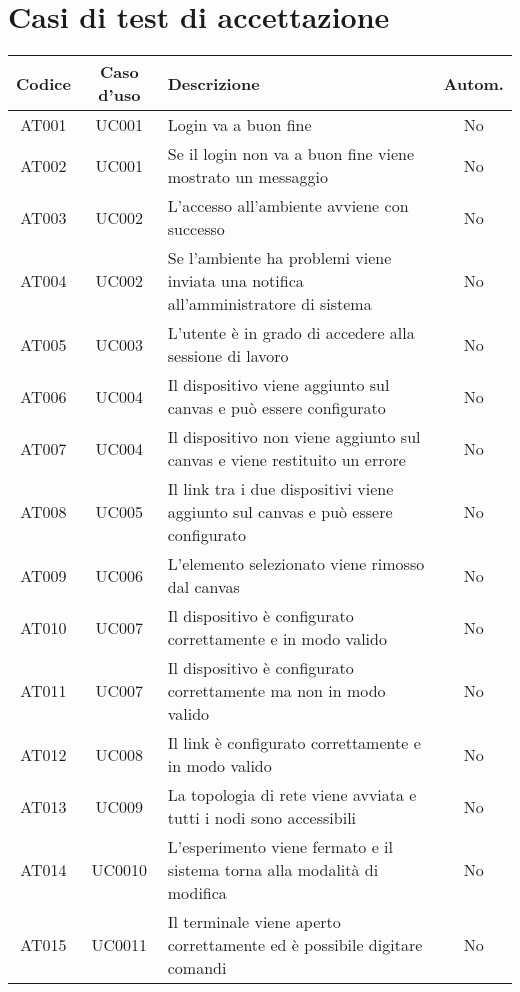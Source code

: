 \documentclass[../main.tex]{subfiles}
\begin{document}
\chapter{Casi di test di accettazione}

\clearpage

\begin{tabularx}{\linewidth}{|c|c|X|c|}
    \toprule
    \textbf{Codice}      & \textbf{Caso d'uso}        & \textbf{Descrizione} & \textbf{Autom.} \\ 
    \midrule
    \endhead
    AT001       & UC001    & Login va a buon fine & No \\ \hline
    AT002       & UC001    & Se il login non va a buon fine viene mostrato un messaggio & No \\ \hline
    AT003       & UC002    & L'accesso all'ambiente avviene con successo & No \\ \hline
    AT004       & UC002    & Se l'ambiente ha problemi viene inviata una notifica all'amministratore di sistema & No \\ \hline
    AT005       & UC003    & L'utente è in grado di accedere alla sessione di lavoro & No \\ \hline
    AT006       & UC004    & Il dispositivo viene aggiunto sul canvas e può essere configurato & No \\ \hline
    AT007       & UC004    & Il dispositivo non viene aggiunto sul canvas e viene restituito un errore & No \\ \hline
    AT008       & UC005    & Il link tra i due dispositivi viene aggiunto sul canvas e può essere configurato & No \\ \hline
    AT009       & UC006    & L'elemento selezionato viene rimosso dal canvas & No \\ \hline
    AT010       & UC007    & Il dispositivo è configurato correttamente e in modo valido & No \\ \hline
    AT011       & UC007    & Il dispositivo è configurato correttamente ma non in modo valido & No \\ \hline
    AT012       & UC008    & Il link è configurato correttamente e in modo valido & No \\ \hline
    AT013       & UC009    & La topologia di rete viene avviata e tutti i nodi sono accessibili & No \\ \hline
    AT014       & UC0010    & L'esperimento viene fermato e il sistema torna alla modalità di modifica & No \\ \hline
    AT015       & UC0011    & Il terminale viene aperto correttamente ed è possibile digitare comandi & No \\ \hline

\end{tabularx}
\end{document}
